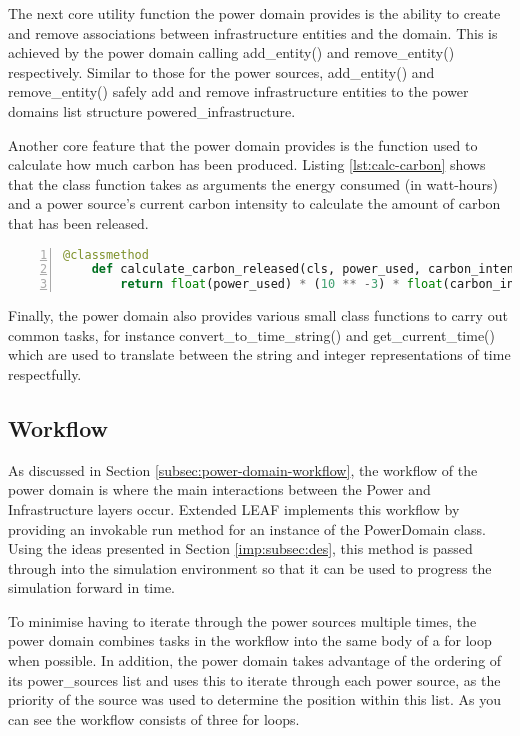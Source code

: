\documentclass{l4proj}
\begin{document}
The next core utility function the power domain provides is the ability to create and remove associations between infrastructure entities and the domain.
This is achieved by the power domain calling add\_entity() and remove\_entity() respectively.
Similar to those for the power sources, add\_entity() and remove\_entity() safely add and remove infrastructure entities to the power domains list structure powered\_infrastructure.

Another core feature that the power domain provides is the function used to calculate how much carbon has been produced.
Listing \ref{lst:calc-carbon} shows that the class function takes as arguments the energy consumed (in watt-hours) and a power source's current carbon intensity to calculate the amount of carbon that has been released.
\begin{lstlisting}[language=python, numbers=left, caption={Listing showing the class method used to calculate carbon emissions.}, label=lst:calc-carbon]
    @classmethod
    def calculate_carbon_released(cls, power_used, carbon_intensity) -> float:
        return float(power_used) * (10 ** -3) * float(carbon_intensity)
\end{lstlisting}

Finally, the power domain also provides various small class functions to carry out common tasks, for instance convert\_to\_time\_string() and get\_current\_time() which are used to translate between the string and integer representations of time respectfully.

\subsection{Workflow}\label{imp:subsec:workflow}
As discussed in Section \ref{subsec:power-domain-workflow}, the workflow of the power domain is where the main interactions between the Power and Infrastructure layers occur.
Extended LEAF implements this workflow by providing an invokable run method for an instance of the PowerDomain class.
Using the ideas presented in Section \ref{imp:subsec:des}, this method is passed through into the simulation environment so that it can be used to progress the simulation forward in time.

To minimise having to iterate through the power sources multiple times, the power domain combines tasks in the workflow into the same body of a for loop when possible.
In addition, the power domain takes advantage of the ordering of its power\_sources list and uses this to iterate through each power source, as the priority of the source was used to determine the position within this list.
As you can see the workflow consists of three for loops.
\end{document}
